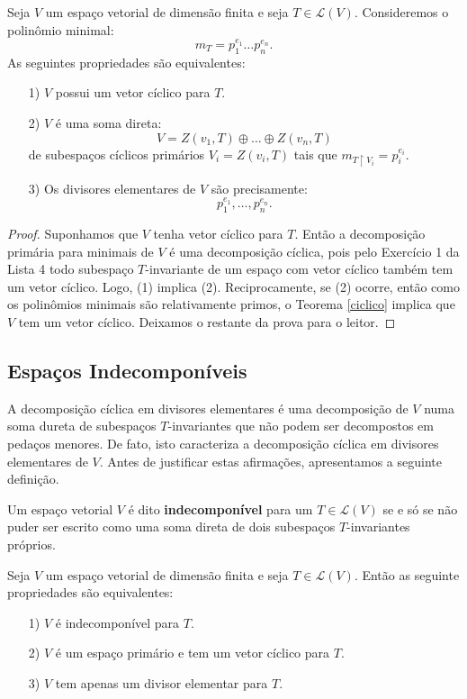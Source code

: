 \documentclass[11pt,twoside,a4paper]{book}
\begin{document}
\begin{teorema}
Seja $V$ um espaço vetorial de dimensão finita e seja $T\in\mathcal{L}(V)$. Consideremos o polinômio minimal:
\[
m_T=p_1^{e_1}\dots p_n^{e_n}.
\]
As seguintes propriedades são equivalentes:
\begin{itemize}
\item[1)] $V$ possui um vetor cíclico para $T$.
\item[2)] $V$ é uma soma direta:
\[
V=Z(v_1,T)\oplus\dots\oplus Z(v_n,T)
\]
de subespaços cíclicos primários $V_i=Z(v_i,T)$ tais que $m_{T\upharpoonright{V_i}}=p_i^{e_i}$.
\item[3)] Os divisores elementares de $V$ são precisamente:
\[
p_1^{e_1},\dots,p_n^{e_n}.
\]
\end{itemize}
\end{teorema}
\begin{proof}
Suponhamos que $V$ tenha vetor cíclico para $T$. Então a decomposição primária para minimais de $V$ é uma decomposição cíclica, pois pelo Exercício 1 da Lista 4 todo subespaço $T$-invariante de um espaço com vetor cíclico também tem um vetor cíclico. Logo, (1) implica (2). Reciprocamente, se (2) ocorre, então como os polinômios minimais são relativamente primos, o Teorema \ref{ciclico} implica que $V$ tem um vetor cíclico. Deixamos o restante da prova para o leitor.
\end{proof}

\subsection{Espaços Indecomponíveis}

A decomposição cíclica em divisores elementares é uma decomposição de $V$ numa soma dureta de subespaços $T$-invariantes que não podem ser decompostos em pedaços menores. De fato, isto caracteriza a decomposição cíclica em divisores elementares de $V$. Antes de justificar estas afirmações, apresentamos a seguinte definição.

\begin{definicao}
Um espaço vetorial $V$ é dito \textbf{indecomponível} para um $T\in\mathcal{L}(V)$ se e só se não puder ser escrito como uma soma direta de dois subespaços $T$-invariantes próprios.
\end{definicao}

\begin{teorema}
Seja $V$ um espaço vetorial de dimensão finita e seja $T\in\mathcal{L}(V)$. Então as seguinte propriedades são equivalentes:
\begin{itemize}
\item[1)] $V$ é indecomponível para $T$.
\item[2)] $V$ é um espaço primário e tem um vetor cíclico para $T$.
\item[3)] $V$ tem apenas um divisor elementar para $T$.
\end{itemize}
\end{teorema}
\end{document}
